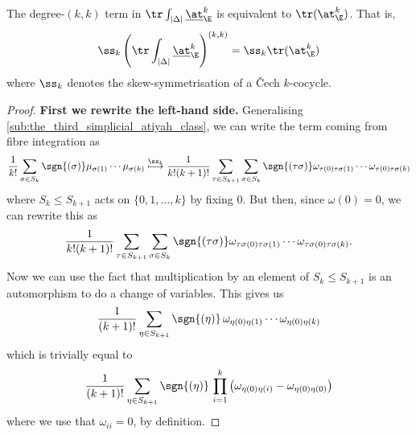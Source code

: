         \begin{theorem}\label{theorem:k-k-term-of-simplicial-atiyah-class}
            The degree-$(k,k)$ term in $\tr\int_{|\Delta|}\underline{\at}_\E^k$ is equivalent to $\tr(\at_\E^k)$.
            That is,
            \[
                \ss_k\left(\tr\int_{|\Delta|}\underline{\at}_\E^k\right)^{(k,k)} = \ss_k\tr(\at_\E^k)
            \]
            where $\ss_k$ denotes the skew-symmetrisation of a Čech $k$-cocycle.
        \end{theorem}
    
        \begin{proof}

            \textbf{First we rewrite the left-hand side.}
            Generalising \cref{sub:the_third_simplicial_atiyah_class}, we can write the term coming from fibre integration as
            \begin{equation*}
                \frac{1}{k!}\sum_{\sigma\in S_{k}}\sgn{(\sigma)}\mu_{\sigma(1)}\cdots\mu_{\sigma(k)} \overset{\ss_k}{\longmapsto} \frac{1}{k!(k+1)!}\sum_{\tau\in S_{k+1}}\sum_{\sigma\in S_{k}}\sgn{(\tau\sigma)}\omega_{\tau(0)\tau\sigma(1)}\cdots\omega_{\tau(0)\tau\sigma(k)}
            \end{equation*}
            where $S_k\leqslant S_{k+1}$ acts on $\{0,1,\ldots,k\}$ by fixing $0$.
            But then, since $\omega(0)=0$, we can rewrite this as
            \begin{equation*}
                \frac{1}{k!(k+1)!}\sum_{\tau\in S_{k+1}}\sum_{\sigma\in S_{k}}\sgn{(\tau\sigma)}\omega_{\tau\sigma(0)\tau\sigma(1)}\cdots\omega_{\tau\sigma(0)\tau\sigma(k)}.
            \end{equation*}
            Now we can use the fact that multiplication by an element of $S_k\leqslant S_{k+1}$ is an automorphism to do a change of variables.
            This gives us
            \begin{equation*}
                \frac{1}{(k+1)!}\sum_{\eta\in S_{k+1}}\sgn{(\eta)}\,\omega_{\eta(0)\eta(1)}\cdots\omega_{\eta(0)\eta(k)}
            \end{equation*}
            which is trivially equal to
            \begin{equation}\label{eq:lhs-kk}
                \frac{1}{(k+1)!}\sum_{\eta\in S_{k+1}}\sgn{(\eta)}\,\prod_{i=1}^k\big(\omega_{\eta(0)\eta(i)}-\omega_{\eta(0)\eta(0)}\big)
            \end{equation}
            where we use that $\omega_{ii}=0$, by definition.


\end{proof}
